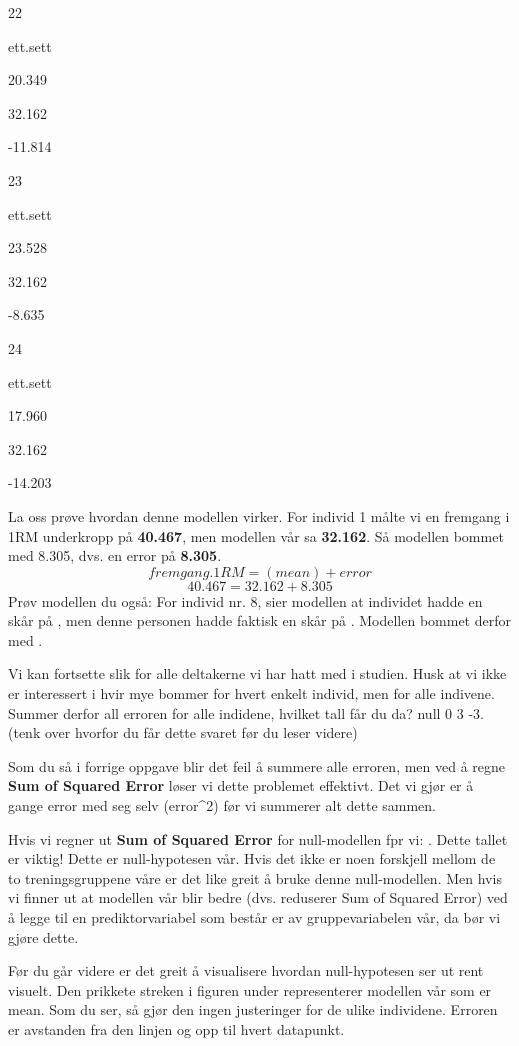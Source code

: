 \documentclass[
]{book}
\begin{document}
22

ett.sett

20.349

32.162

-11.814

23

ett.sett

23.528

32.162

-8.635

24

ett.sett

17.960

32.162

-14.203

La oss prøve hvordan denne modellen virker. For individ 1 målte vi en fremgang i 1RM underkropp på \textbf{40.467}, men modellen vår sa \textbf{32.162}. Så modellen bommet med 8.305, dvs. en error på \textbf{8.305}.
\[
fremgang.1RM = (mean) + error
\]
\[
40.467 = 32.162 + 8.305
\]
Prøv modellen du også: For individ nr. 8, sier modellen at individet hadde en skår på , men denne personen hadde faktisk en skår på . Modellen bommet derfor med .

Vi kan fortsette slik for alle deltakerne vi har hatt med i studien. Husk at vi ikke er interessert i hvir mye bommer for hvert enkelt individ, men for alle indivene. Summer derfor all erroren for alle indidene, hvilket tall får du da? null 0 3 -3. (tenk over hvorfor du får dette svaret før du leser videre)

Som du så i forrige oppgave blir det feil å summere alle erroren, men ved å regne \textbf{Sum of Squared Error} løser vi dette problemet effektivt. Det vi gjør er å gange error med seg selv (error\^{}2) før vi summerer alt dette sammen.

Hvis vi regner ut \textbf{Sum of Squared Error} for null-modellen fpr vi: . Dette tallet er viktig! Dette er null-hypotesen vår. Hvis det ikke er noen forskjell mellom de to treningsgruppene våre er det like greit å bruke denne null-modellen. Men hvis vi finner ut at modellen vår blir bedre (dvs. reduserer Sum of Squared Error) ved å legge til en prediktorvariabel som består er av gruppevariabelen vår, da bør vi gjøre dette.

Før du går videre er det greit å visualisere hvordan null-hypotesen ser ut rent visuelt. Den prikkete streken i figuren under representerer modellen vår som er mean. Som du ser, så gjør den ingen justeringer for de ulike individene. Erroren er avstanden fra den linjen og opp til hvert datapunkt.
\end{document}
